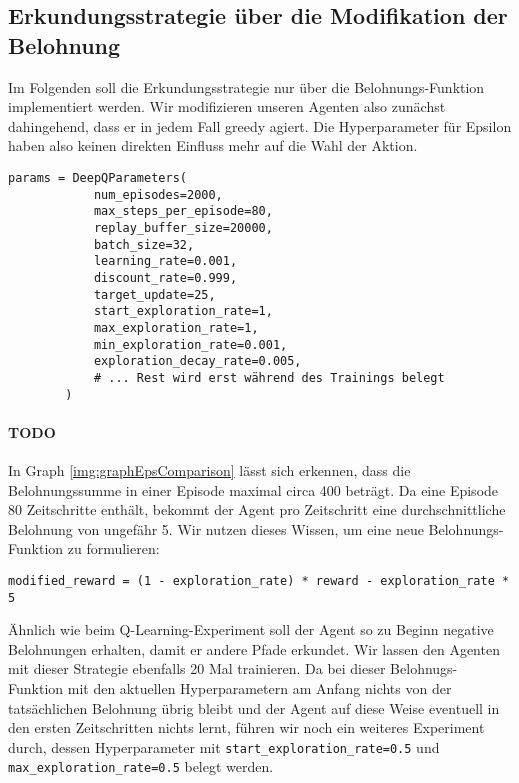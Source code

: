 \subsection{Erkundungsstrategie über die Modifikation der Belohnung}
Im Folgenden soll die Erkundungsstrategie nur über die Belohnungs-Funktion implementiert werden. Wir modifizieren unseren Agenten also zunächst dahingehend, dass er in jedem Fall greedy agiert. Die Hyperparameter für Epsilon haben also keinen direkten Einfluss mehr auf die Wahl der Aktion.
\begin{verbatim}
params = DeepQParameters(
            num_episodes=2000,
            max_steps_per_episode=80,
            replay_buffer_size=20000,
            batch_size=32,
            learning_rate=0.001,
            discount_rate=0.999,
            target_update=25,
            start_exploration_rate=1,
            max_exploration_rate=1,
            min_exploration_rate=0.001,
            exploration_decay_rate=0.005,
            # ... Rest wird erst während des Trainings belegt
        )
\end{verbatim}

\paragraph{TODO}
In Graph \ref{img:graphEpsComparison} lässt sich erkennen, dass die Belohnungssumme in einer Episode maximal circa 400 beträgt. Da eine Episode 80 Zeitschritte enthält, bekommt der Agent pro Zeitschritt eine durchschnittliche Belohnung von ungefähr 5. Wir nutzen dieses Wissen, um eine neue Belohnungs-Funktion zu formulieren:
\begin{verbatim}
modified_reward = (1 - exploration_rate) * reward - exploration_rate * 5
\end{verbatim}
Ähnlich wie beim Q-Learning-Experiment soll der Agent so zu Beginn negative Belohnungen erhalten, damit er andere Pfade erkundet. Wir lassen den Agenten mit dieser Strategie ebenfalls 20 Mal trainieren. Da bei dieser Belohnugs-Funktion mit den aktuellen Hyperparametern am Anfang nichts von der tatsächlichen Belohnung übrig bleibt und der Agent auf diese Weise eventuell in den ersten Zeitschritten nichts lernt, führen wir noch ein weiteres Experiment durch, dessen Hyperparameter mit \texttt{start_exploration_rate=0.5} und \texttt{max_exploration_rate=0.5} belegt werden.

